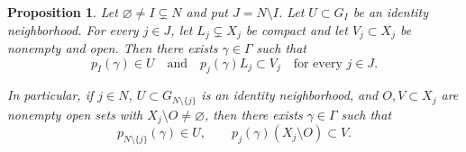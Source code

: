 \documentclass[10pt,a4paper]{amsart}
\newtheorem{proposition}[theorem]{Proposition}
\begin{document}
	\begin{proposition}
		\label{lem:abstract-recurrence-contraction}
		\label{prop:codim-one-strip}
		Let $\varnothing\neq I\subsetneq N$ and put $J=N\setminus I$.  Let
		$U\subset G_I$ be an identity neighborhood.  For every $j\in J$, let
		$L_j\subsetneq X_j$ be compact and let $V_j\subset X_j$ be nonempty and open.
		Then there exists $\gamma\in\Gamma$ such that
		\begin{equation}
			\label{eq:simultaneous-recurrence-contraction}
			p_I(\gamma)\in U
			\quad\text{and}\quad
			p_j(\gamma)L_j\subset V_j
			\quad\text{for every }j\in J.
		\end{equation}
		
		In particular, if $j\in N$, $U\subset G_{N\setminus\{j\}}$ is an identity
		neighborhood, and $O,V\subset X_j$ are nonempty open sets with
		$X_j\setminus O\neq\varnothing$, then there exists $\gamma\in\Gamma$ such that
		\begin{equation}
			\label{eq:codim-one-strip}
			p_{N\setminus\{j\}}(\gamma)\in U,
			\qquad
			p_j(\gamma)(X_j\setminus O)\subset V.
		\end{equation}
	\end{proposition}
\end{document}
